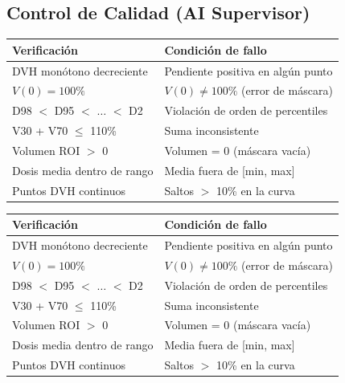 \documentclass[12pt,a4paper]{article}
\begin{document}
\begin{tcolorbox}[aiSupervisor]
\subsection*{Control de Calidad (AI Supervisor)}

\begin{tabular}{p{5cm} p{10cm}}
\toprule
\textbf{Verificación} & \textbf{Condición de fallo} \\
\midrule
DVH monótono decreciente & Pendiente positiva en algún punto \\
$V(0) = 100\%$ & $V(0) \neq 100\%$ (error de máscara) \\
D98 $<$ D95 $<$ $\ldots$ $<$ D2 & Violación de orden de percentiles \\
V30 + V70 $\leq$ 110\% & Suma inconsistente \\
Volumen ROI $>$ 0 & Volumen = 0 (máscara vacía) \\
Dosis media dentro de rango & Media fuera de [min, max] \\
Puntos DVH continuos & Saltos $>$ 10\% en la curva \\
\bottomrule
\end{tabular}

\newpage




\begin{tabular}{p{5cm} p{10cm}}
\toprule
\textbf{Verificación} & \textbf{Condición de fallo} \\
\midrule
DVH monótono decreciente & Pendiente positiva en algún punto \\
$V(0) = 100\%$ & $V(0) \neq 100\%$ (error de máscara) \\
D98 $<$ D95 $<$ $\ldots$ $<$ D2 & Violación de orden de percentiles \\
V30 + V70 $\leq$ 110\% & Suma inconsistente \\
Volumen ROI $>$ 0 & Volumen = 0 (máscara vacía) \\
Dosis media dentro de rango & Media fuera de [min, max] \\
Puntos DVH continuos & Saltos $>$ 10\% en la curva \\
\bottomrule
\end{tabular}

\newpage

\end{tcolorbox}
\end{document}
